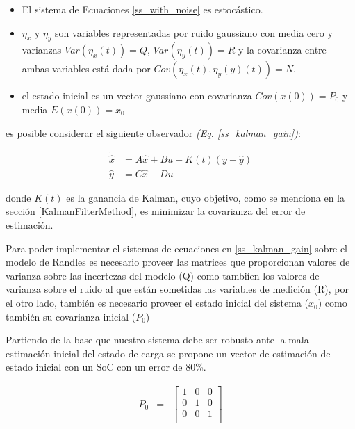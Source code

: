 \documentclass[10pt,a4paper]{article}
\begin{document}
\begin{itemize}
    \item El sistema de Ecuaciones \ref{ss_with_noise} es estoc\'astico.
    \item $\eta_x$ y $\eta_y$ son variables representadas por ruido gaussiano
        con media cero y varianzas $Var\left(\eta_x(t)\right) = Q$,
        $Var\left(\eta_y(t)\right) = R$ y la covarianza entre ambas variables
        est\'a dada por $Cov\left(\eta_x(t), \eta_y(y)(t)\right) = N$.
    \item el estado inicial es un vector gaussiano con covarianza
        $Cov\left(x(0)\right) = P_0$ y media $E\left(x(0)\right) = x_0$
\end{itemize}

es posible considerar el siguiente observador \emph{(Eq. \ref{ss_kalman_gain})}:

\begin{align}
    \dot{\hat{x}} &= A\hat{x} + Bu + K(t)(y - \hat{y})\nonumber\\
    \hat{y} &= C\hat{x} + Du \label{ss_kalman_gain}
\end{align}

donde $K(t)$ es la ganancia de Kalman, cuyo objetivo, como se menciona en la
secci\'on \ref{KalmanFilterMethod}, es minimizar la covarianza del error de
estimaci\'on. 

\newpage

Para poder implementar el sistemas de ecuaciones en \ref{ss_kalman_gain} sobre
el modelo de Randles es necesario proveer las matrices que proporcionan valores 
de varianza sobre las incertezas del modelo (Q) como tambi\'ien los valores de
varianza sobre el ruido al que est\'an sometidas las variables de medici\'on
(R), por el otro lado, tambi\'en es necesario proveer el estado inicial del
sistema ($x_0$) como tambi\'en su covarianza inicial ($P_0$)

Partiendo de la base que nuestro sistema debe ser robusto ante la mala
estimación inicial del estado de carga se propone un vector de estimación
de estado inicial con un SoC con un error de 80\%.

\begin{equation}
    \begin{array}{llll}
	P_0 & = & \begin{bmatrix}
	    1 & 0 & 0 \\
	    0 & 1 & 0 \\
	    0 & 0 & 1 \\
	\end{bmatrix} 
    \end{array} \nonumber
\end{equation}
\end{document}
